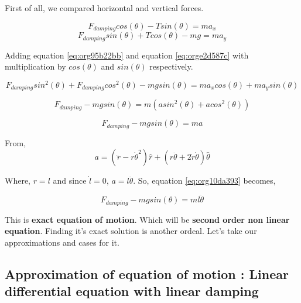 \documentclass[11pt,a4paper]{article}
\begin{document}
First of all, we compared horizontal and vertical forces.

\begin{equation}
\label{eq:org95b22bb}
   F_{damping}cos(\theta)-Tsin(\theta)=ma_{x}
\end{equation}
\begin{equation}
\label{eq:orge2d587c}
   F_{damping}sin(\theta)+Tcos(\theta)-mg=ma_{y}
\end{equation}

Adding equation \ref{eq:org95b22bb} and equation \ref{eq:orge2d587c} with multiplication by \(cos(\theta)\) and \(sin(\theta)\) respectively.

\begin{equation*}
\label{eq:org68cab11}
F_{damping}sin^{2}(\theta)+F_{damping}cos^{2}(\theta)-mgsin(\theta)=ma_{x}cos(\theta)+ma_{y}sin(\theta)
\end{equation*}

\begin{equation*}
\label{eq:org945e099}
F_{damping}-mgsin(\theta)=m(asin^{2}(\theta)+acos^{2}(\theta))
\end{equation*}

\begin{equation}
\label{eq:org10da393}
F_{damping}-mgsin(\theta)=ma
\end{equation}

From,
\begin{equation*}
\label{eq:org9e43cbb}
a = (\ddot{r}-r\dot{\theta}^{2})\hat{r} + (r \ddot{\theta}+2\dot{r}\dot{\theta})\hat{\theta}
\end{equation*}

Where,  \(r=l\) and since \(\dot{l}=0\), \(a=l\ddot{\theta}\). So, equation \ref{eq:org10da393} becomes,

\begin{equation}
\label{eq:orgee934b2}
F_{damping}-mgsin(\theta)=ml\ddot{\theta}
\end{equation}

This is \textbf{exact equation of motion}. Which will be \textbf{second order non linear equation}. Finding it's exact solution is another ordeal. Let's take our approximations and cases for it.

\subsection{Approximation of equation of motion : Linear differential equation with linear damping}
\label{sec:org6a81754}
\end{document}
